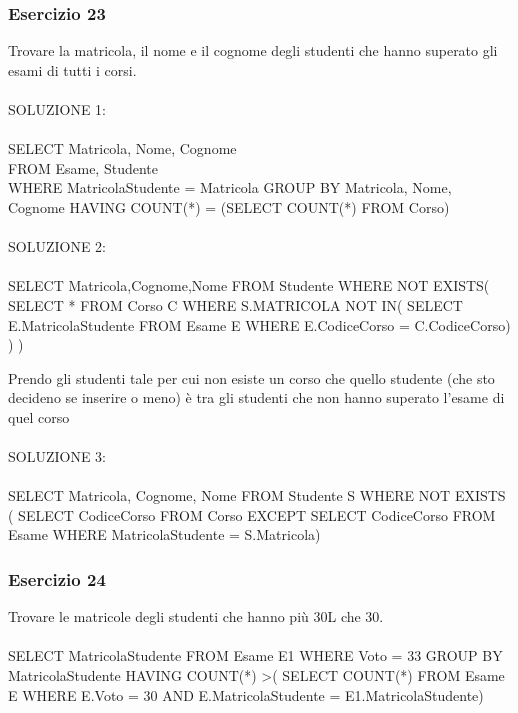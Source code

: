 \documentclass[12pt,a4paper]{book}
\begin{document}
\subsubsection{Esercizio 23}
Trovare la matricola, il nome e il cognome degli studenti che hanno superato gli esami di tutti i corsi.\\
\\
SOLUZIONE 1:\\
\\
SELECT Matricola, Nome, Cognome\\
FROM Esame, Studente\\
WHERE MatricolaStudente = Matricola
GROUP BY Matricola, Nome, Cognome
HAVING COUNT(*) = (SELECT COUNT(*) FROM Corso)\\
\\
SOLUZIONE 2:\\
\\
SELECT Matricola,Cognome,Nome
FROM Studente
WHERE NOT EXISTS(
    SELECT * FROM Corso C
    WHERE S.MATRICOLA NOT IN(
        SELECT E.MatricolaStudente
        FROM Esame E
        WHERE E.CodiceCorso = C.CodiceCorso)
    )
)

Prendo gli studenti tale per cui non esiste un corso che quello studente (che sto decideno se inserire o meno) è tra gli studenti che non hanno superato l'esame di quel corso\\
\\
SOLUZIONE 3:\\
\\
SELECT Matricola, Cognome, Nome
FROM Studente S
WHERE NOT EXISTS (
    SELECT CodiceCorso
    FROM Corso
    EXCEPT
    SELECT CodiceCorso
    FROM Esame
    WHERE MatricolaStudente = S.Matricola)

\subsubsection{Esercizio 24}
Trovare le matricole degli studenti che hanno più 30L che 30.\\
\\
SELECT MatricolaStudente
FROM Esame E1
WHERE Voto = 33
GROUP BY MatricolaStudente
HAVING COUNT(*) >(
    SELECT COUNT(*)
    FROM Esame E
    WHERE E.Voto = 30
    AND E.MatricolaStudente = E1.MatricolaStudente)
    
\end{document}
